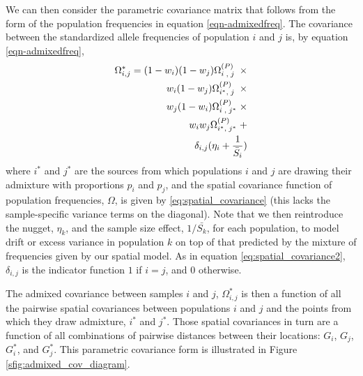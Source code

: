 \documentclass[12pt]{article}
\newcommand{\kadmixsource}[1]{{$G^{*}_{#1}$}}
\newcommand{\identifyadmixsource}[1]{{#1^{*}}}
\begin{document}
We can then consider the parametric covariance matrix that follows from the form of the population frequencies in equation \eqref{eqn-admixedfreq}. The covariance between the standardized allele frequencies of population $i$ and $j$ is, by equation \eqref{eqn-admixedfreq},
\begin{alignat}{3}
\label{eq:admixed_covariance_1}
\identifyadmixsource{\Omega_{i,j}} = (1-w_i)(1-w_j) \Omega^{(P)}_{i\;,\;j\;} \; \times&\\
w_i(1-w_j) \Omega^{(P)}_{\identifyadmixsource{i},\;j\;} \; \times   \notag&\\
w_j(1-w_i) \Omega^{(P)}_{i\;,\;\identifyadmixsource{j}} \; \times   \notag&\\
w_i w_j \Omega^{(P)}_{\identifyadmixsource{i},\;\identifyadmixsource{j}} \; +   \notag&\\
\delta_{i,j} (\eta_i + \frac{1}{\bar{S}_i}) \notag&
\end{alignat}
where $\identifyadmixsource{i}$ and $\identifyadmixsource{j}$ are the sources from which populations $i$ and $j$ are drawing their admixture with proportions $p_i$ and $p_j$, and the spatial covariance function of population frequencies, $\Omega$, is given by \eqref{eq:spatial_covariance} (this lacks the sample-specific variance terms on the diagonal). Note that we then reintroduce the nugget, $\eta_k$, and the sample size effect, $1/\bar{S_k}$, for each population, to model drift or excess variance in population $k$ on top of that predicted by the mixture of frequencies given by our spatial model.  As in equation \eqref{eq:spatial_covariance2}, $\delta_{i,j} $ is the indicator function $1$ if $i=j$, and $0$ otherwise. 


The admixed covariance between samples $i$ and $j$, $\identifyadmixsource{\Omega_{i,j}}$ is then a function of all the pairwise spatial covariances between populations $i$ and $j$ and the points from which they draw admixture, $\identifyadmixsource{i}$ and $\identifyadmixsource{j}$.  Those spatial covariances in turn are a function of all combinations of pairwise distances between their locations: $G_i$, $G_j$, \kadmixsource{i}, and \kadmixsource{j}.  This parametric covariance form is illustrated in Figure \ref{sfig:admixed_cov_diagram}.
\end{document}
